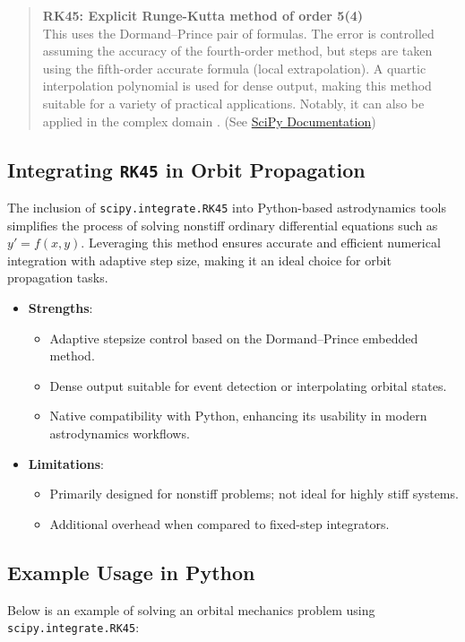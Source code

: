 \begin{quote}
\textbf{RK45: Explicit Runge-Kutta method of order 5(4)} \\
This uses the Dormand–Prince pair of formulas. The error is controlled assuming the accuracy of the fourth-order method, but steps are taken using the fifth-order accurate formula (local extrapolation). A quartic interpolation polynomial is used for dense output, making this method suitable for a variety of practical applications. Notably, it can also be applied in the complex domain \cite{scipy2024rk45}. (See \href{https://docs.scipy.org/doc/scipy/reference/generated/scipy.integrate.RK45.html}{SciPy Documentation})
\end{quote}

\subsection{Integrating \texttt{RK45} in Orbit Propagation}
The inclusion of \texttt{scipy.integrate.RK45} into Python-based astrodynamics tools simplifies the process of solving nonstiff ordinary differential equations such as \( y' = f(x, y) \). Leveraging this method ensures accurate and efficient numerical integration with adaptive step size, making it an ideal choice for orbit propagation tasks.

\begin{itemize}
    \item \textbf{Strengths}:
    \begin{itemize}
        \item Adaptive stepsize control based on the Dormand–Prince embedded method.
        \item Dense output suitable for event detection or interpolating orbital states.
        \item Native compatibility with Python, enhancing its usability in modern astrodynamics workflows.
    \end{itemize}
    \item \textbf{Limitations}:
    \begin{itemize}
        \item Primarily designed for nonstiff problems; not ideal for highly stiff systems.
        \item Additional overhead when compared to fixed-step integrators.
    \end{itemize}
\end{itemize}

\subsection{Example Usage in Python}
Below is an example of solving an orbital mechanics problem using \texttt{scipy.integrate.RK45}:

